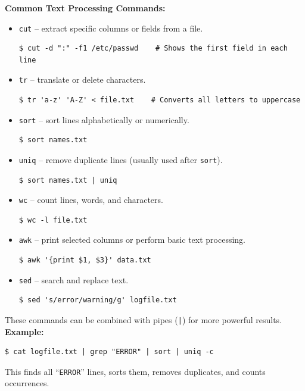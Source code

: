 \textbf{Common Text Processing Commands:}
\begin{itemize}
    \item \texttt{cut} -- extract specific columns or fields from a file.
\begin{lstlisting}[language=Terminal]
$ cut -d ":" -f1 /etc/passwd    # Shows the first field in each line
\end{lstlisting}

    \item \texttt{tr} -- translate or delete characters.
\begin{lstlisting}[language=Terminal]
$ tr 'a-z' 'A-Z' < file.txt    # Converts all letters to uppercase
\end{lstlisting}

    \item \texttt{sort} -- sort lines alphabetically or numerically.
\begin{lstlisting}[language=Terminal]
$ sort names.txt
\end{lstlisting}

    \item \texttt{uniq} -- remove duplicate lines (usually used after \texttt{sort}).
\begin{lstlisting}[language=Terminal]
$ sort names.txt | uniq
\end{lstlisting}

    \item \texttt{wc} -- count lines, words, and characters.
\begin{lstlisting}[language=Terminal]
$ wc -l file.txt
\end{lstlisting}

    \item \texttt{awk} -- print selected columns or perform basic text processing.
\begin{lstlisting}[language=Terminal]
$ awk '{print $1, $3}' data.txt
\end{lstlisting}

    \item \texttt{sed} -- search and replace text.
\begin{lstlisting}[language=Terminal]
$ sed 's/error/warning/g' logfile.txt
\end{lstlisting}
\end{itemize}

These commands can be combined with pipes (\texttt{|}) for more powerful results.\\
\textbf{Example:}
\begin{lstlisting}[language=Terminal]
$ cat logfile.txt | grep "ERROR" | sort | uniq -c
\end{lstlisting}
This finds all ``\texttt{ERROR}'' lines, sorts them, removes duplicates, and counts occurrences.

